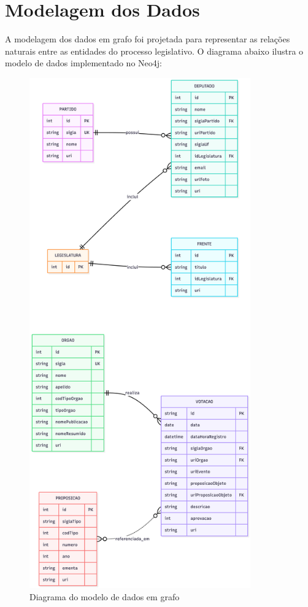 \documentclass[12pt,a4paper]{article}
\begin{document}
\section{Modelagem dos Dados}

A modelagem dos dados em grafo foi projetada para representar as relações naturais entre as entidades do processo legislativo. O diagrama abaixo ilustra o modelo de dados implementado no Neo4j:

\begin{figure}[p]
    \centering
    \includegraphics[width=0.85\textwidth,height=0.85\textheight,keepaspectratio]{diagram/Diagram_Mermaid.png}
    \caption{Diagrama do modelo de dados em grafo}
    \label{fig:diagram}
\end{figure}
\end{document}
